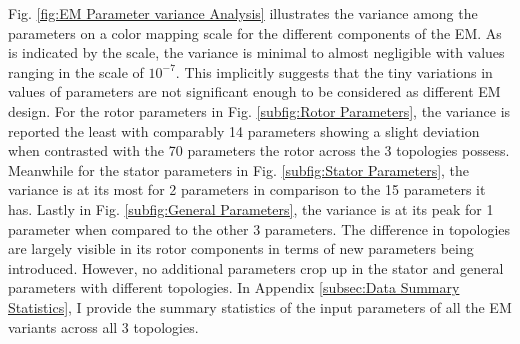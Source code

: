 \documentclass{report} %
\begin{document}
Fig. \ref{fig:EM Parameter variance Analysis} illustrates the variance among the parameters on a color mapping scale for the different components of the \ac{EM}.
As is indicated by the scale, the variance is minimal to almost negligible with values ranging in the scale of $10^{-7}$. This implicitly suggests that the tiny 
variations in values of parameters are not significant enough to be considered as different \ac{EM} design.
For the rotor parameters in Fig. \ref{subfig:Rotor Parameters}, the variance is reported the least with comparably 14 parameters showing a slight deviation when 
contrasted with the 70 parameters the rotor across the 3 topologies possess. Meanwhile for the stator parameters in Fig. \ref{subfig:Stator Parameters}, the variance is 
at its most for 2 parameters in comparison to the 15 parameters it has. Lastly in Fig. \ref{subfig:General Parameters}, the variance is at its peak for 1 parameter when 
compared to the other 3 parameters. The difference in topologies are largely visible in its rotor components in terms of new parameters being introduced. However, no 
additional parameters crop up in the stator and general parameters with different topologies.
In Appendix \ref{subsec:Data Summary Statistics}, I provide the summary statistics of the input parameters of all the \ac{EM} variants across all 3 topologies. 
\end{document}

